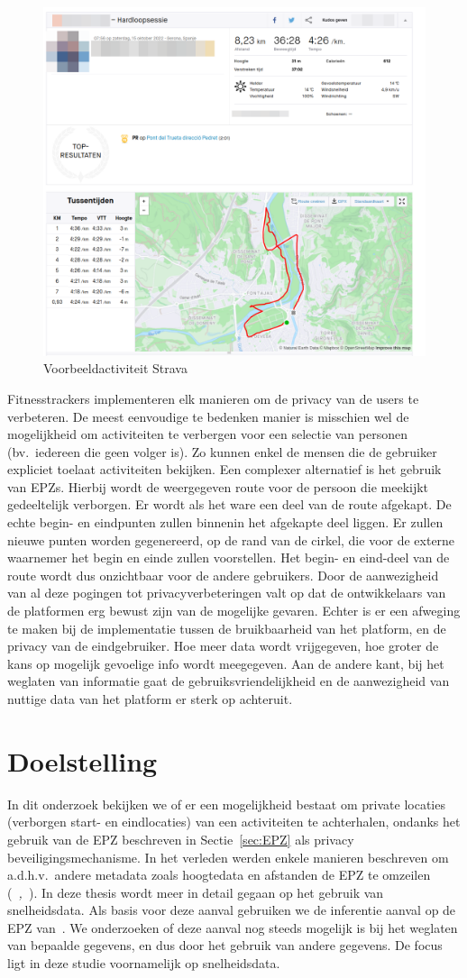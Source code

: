 \begin{figure}
    \centering
    \includegraphics[width=0.5\linewidth]{fig/VoorbeeldActiviteiten/VoorbeeldActiviteit_Cropped.png}
    \caption{Voorbeeldactiviteit Strava}\label{fig:activityExample}
\end{figure}

Fitnesstrackers implementeren elk manieren om de privacy van de users te
verbeteren. De meest eenvoudige te bedenken manier is misschien wel de
mogelijkheid om activiteiten te verbergen voor een selectie van personen (bv.\
iedereen die geen volger is). Zo kunnen enkel de mensen die de gebruiker
expliciet toelaat activiteiten bekijken. Een complexer alternatief is het
gebruik van \acp{EPZ}. Hierbij wordt de weergegeven route voor de persoon die
meekijkt gedeeltelijk verborgen. Er wordt als het ware een deel van de route
afgekapt. De echte begin- en eindpunten zullen binnenin het afgekapte deel
liggen. Er zullen nieuwe punten worden gegenereerd, op de rand van de cirkel,
die voor de externe waarnemer het begin en einde zullen voorstellen. Het begin-
en eind-deel van de route wordt dus onzichtbaar voor de andere gebruikers. Door
de aanwezigheid van al deze pogingen tot privacyverbeteringen valt op dat de
ontwikkelaars van de platformen erg bewust zijn van de mogelijke gevaren.
Echter is er een afweging te maken bij de implementatie tussen de bruikbaarheid
van het platform, en de privacy van de eindgebruiker. Hoe meer data wordt
vrijgegeven, hoe groter de kans op mogelijk gevoelige info wordt meegegeven.
Aan de andere kant, bij het weglaten van informatie gaat de
gebruiksvriendelijkheid en de aanwezigheid van nuttige data van het platform er
sterk op achteruit.

\section{Doelstelling}
In dit onderzoek bekijken we of er een mogelijkheid bestaat om private locaties
(verborgen start- en eindlocaties) van een activiteiten te achterhalen, ondanks
het gebruik van de \ac{EPZ} beschreven in Sectie~\ref{sec:EPZ} als privacy
beveiligingsmechanisme. In het verleden werden enkele manieren beschreven om
a.d.h.v.\ andere metadata zoals hoogtedata en afstanden de \ac{EPZ} te omzeilen
(\textit{~\cite{Dhondt},~\cite{Verdonck_2022}}). In deze thesis wordt meer in
detail gegaan op het gebruik van snelheidsdata. Als basis voor deze aanval
gebruiken we de inferentie aanval op de EPZ van~\citeauthor{Dhondt}. We
onderzoeken of deze aanval nog steeds mogelijk is bij het weglaten van bepaalde
gegevens, en dus door het gebruik van andere gegevens. De focus ligt in deze
studie voornamelijk op snelheidsdata.

